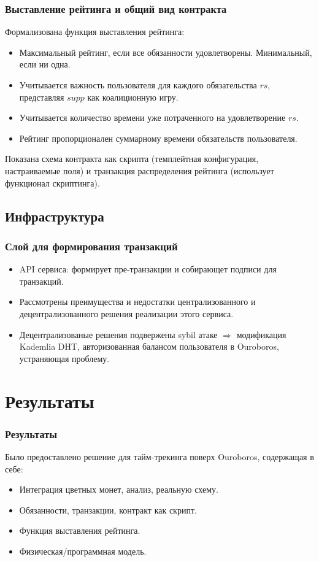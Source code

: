 \documentclass[11pt,handout,pdf,hyperref={unicode}]{beamer}
\begin{document}
\begin{frame}
  \frametitle{Выставление рейтинга и общий вид контракта}

  Формализована функция выставления рейтинга:
  \begin{itemize}
  \item Максимальный рейтинг, если все обязанности
    удовлетворены. Минимальный, если ни одна.
  \item Учитывается важность пользователя для каждого обязательства
    $rs$, представляя $supp$ как коалиционную игру.
  \item Учитывается количество времени уже потраченного на
    удовлетворение $rs$.
  \item Рейтинг пропорционален суммарному времени обязательств
    пользователя.
  \end{itemize}

  Показана схема контракта как скрипта (темплейтная конфигурация,
  настраиваемые поля) и транзакция распределения рейтинга (использует
  функционал скриптинга).
\end{frame}

\subsection{Инфраструктура}

\begin{frame}
  \frametitle{Слой для формирования транзакций}

  \begin{itemize}
  \item API сервиса: формирует пре-транзакции и собирающет подписи для
    транзакций.
  \item Рассмотрены преимущества и недостатки централизованного и
    децентрализованного решения реализации этого сервиса.
  \item Децентрализованые решения подвержены sybil атаке $\Rightarrow$
    модификация Kademlia DHT, авторизованная балансом
    пользователя в Ouroboros, устраняющая проблему.
  \end{itemize}
\end{frame}

\section{Результаты}

\begin{frame}
  \frametitle{Результаты}

  Было предоставлено решение для тайм-трекинга поверх Ouroboros,
  содержащая в себе:
  \begin{itemize}
  \item Интеграция цветных монет, анализ, реальную схему.
  \item Обязанности, транзакции, контракт как скрипт.
  \item Функция выставления рейтинга.
  \item Физическая/программная модель.
  \end{itemize}
\end{frame}
\end{document}
